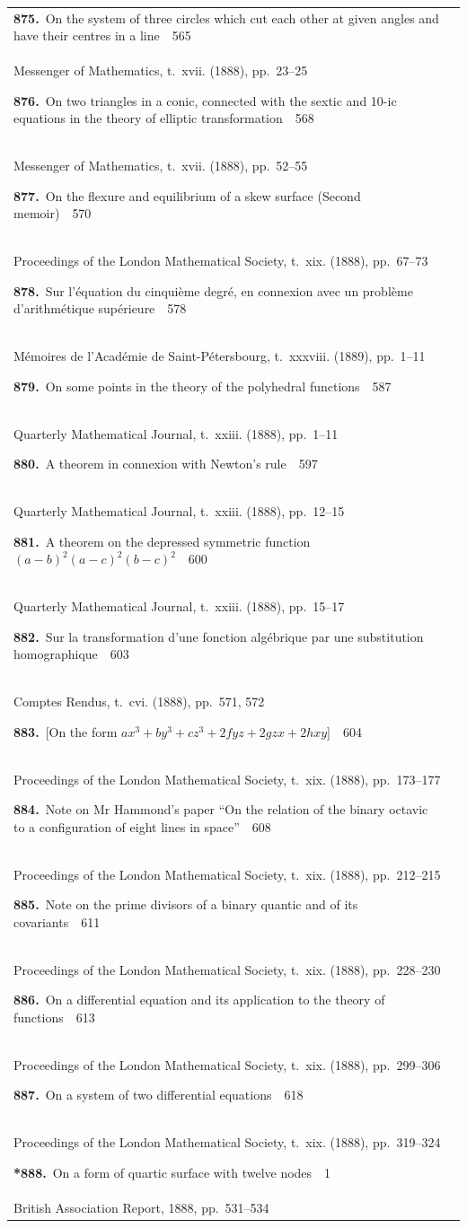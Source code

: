 \documentclass[11pt,a4paper]{book}
\newcommand{\paperentry}[4]{%
  \noindent\textbf{#1.}\ {#2}\ \dotfill\ {#3}\\[-0.2em]%
  {\small #4}\par\vspace{0.6em}%
}
\newcommand{\paperentrystar}[4]{%
  \noindent\textbf{*#1.}\ {#2}\ \dotfill\ {#3}\\[-0.2em]%
  {\small #4}\par\vspace{0.6em}%
}
\begin{document}
\begin{center}
\begin{tabular}{p{4.2in}r}
\paperentry{875}{On the system of three circles which cut each other at given angles and have their centres in a line}{565}{Messenger of Mathematics, t.~xvii. (1888), pp.~23--25}
\paperentry{876}{On two triangles in a conic, connected with the sextic and 10-ic equations in the theory of elliptic transformation}{568}{Messenger of Mathematics, t.~xvii. (1888), pp.~52--55}
\paperentry{877}{On the flexure and equilibrium of a skew surface (Second memoir)}{570}{Proceedings of the London Mathematical Society, t.~xix. (1888), pp.~67--73}
\paperentry{878}{Sur l'\'{e}quation du cinqui\`{e}me degr\'{e}, en connexion avec un probl\`{e}me d'arithm\'{e}tique sup\'{e}rieure}{578}{M\'{e}moires de l'Acad\'{e}mie de Saint-P\'{e}tersbourg, t.~xxxviii. (1889), pp.~1--11}
\paperentry{879}{On some points in the theory of the polyhedral functions}{587}{Quarterly Mathematical Journal, t.~xxiii. (1888), pp.~1--11}
\paperentry{880}{A theorem in connexion with Newton's rule}{597}{Quarterly Mathematical Journal, t.~xxiii. (1888), pp.~12--15}
\paperentry{881}{A theorem on the depressed symmetric function $(a - b)^{2}(a - c)^{2}(b - c)^{2}$}{600}{Quarterly Mathematical Journal, t.~xxiii. (1888), pp.~15--17}
\paperentry{882}{Sur la transformation d'une fonction alg\'{e}brique par une substitution homographique}{603}{Comptes Rendus, t.~cvi. (1888), pp.~571, 572}
\paperentry{883}{[On the form $ax^{3} + by^{3} + cz^{3} + 2fyz + 2gzx + 2hxy$]}{604}{Proceedings of the London Mathematical Society, t.~xix. (1888), pp.~173--177}
\paperentry{884}{Note on Mr Hammond's paper ``On the relation of the binary octavic to a configuration of eight lines in space''}{608}{Proceedings of the London Mathematical Society, t.~xix. (1888), pp.~212--215}
\paperentry{885}{Note on the prime divisors of a binary quantic and of its covariants}{611}{Proceedings of the London Mathematical Society, t.~xix. (1888), pp.~228--230}
\paperentry{886}{On a differential equation and its application to the theory of functions}{613}{Proceedings of the London Mathematical Society, t.~xix. (1888), pp.~299--306}
\paperentry{887}{On a system of two differential equations}{618}{Proceedings of the London Mathematical Society, t.~xix. (1888), pp.~319--324}
\paperentrystar{888}{On a form of quartic surface with twelve nodes}{1}{British Association Report, 1888, pp.~531--534}
\end{tabular}
\end{center}
\end{document}
